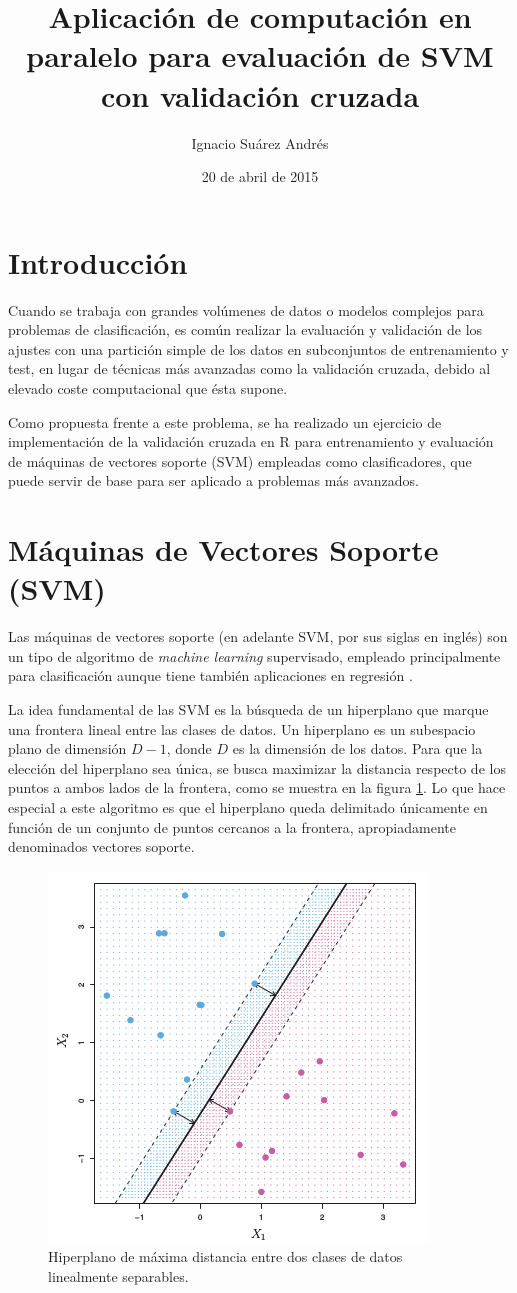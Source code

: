 \documentclass[12pt]{scrartcl}
\title{Aplicación de computación en paralelo para evaluación de SVM con validación cruzada}
\author{Ignacio Suárez Andrés}
\date{20 de abril de 2015}
\begin{document}

\maketitle
\section{Introducción}
Cuando se trabaja con grandes volúmenes de datos o modelos complejos para problemas de clasificación, es común realizar la evaluación y validación de los ajustes con una partición simple de los datos en subconjuntos de entrenamiento y test, en lugar de técnicas más avanzadas como la validación cruzada, debido al elevado coste computacional que ésta supone.\par
Como propuesta frente a este problema, se ha realizado un ejercicio de implementación de la validación cruzada en R \cite{Rcita} para entrenamiento y evaluación de máquinas de vectores soporte (SVM) empleadas como clasificadores, que puede servir de base para ser aplicado a problemas más avanzados.\par
\section{Máquinas de Vectores Soporte (SVM)}
Las máquinas de vectores soporte (en adelante SVM, por sus siglas en inglés) son un tipo de algoritmo de \textit{machine learning} supervisado, empleado principalmente para clasificación aunque tiene también aplicaciones en regresión \cite{islr}.\par
La idea fundamental de las SVM es la búsqueda de un hiperplano que marque una frontera lineal entre las clases de datos. Un hiperplano es un subespacio plano de dimensión $D-1$, donde $D$ es la dimensión de los datos. Para que la elección del hiperplano sea única, se busca maximizar la distancia respecto de los puntos a ambos lados de la frontera, como se muestra en la figura \ref{fig:svmlineal}. Lo que hace especial a este algoritmo es que el hiperplano queda delimitado únicamente en función de un conjunto de puntos cercanos a la frontera, apropiadamente denominados vectores soporte.\par

\begin{figure}[h]
\centering
\includegraphics [width=8 cm]{svmlinear}
\caption{Hiperplano de máxima distancia entre dos clases de datos linealmente separables.}
\label{fig:svmlineal}
\end{figure}
\end{document}
